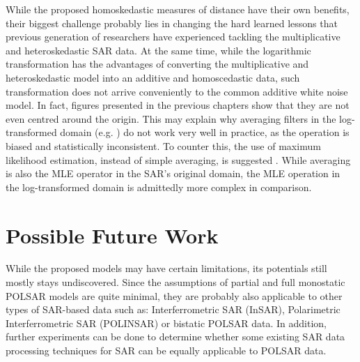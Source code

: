 While
                the proposed homoskedastic measures of distance have
                their own benefits, their biggest challenge probably
                lies in changing the hard learned lessons that
                previous generation of researchers have experienced tackling
                the multiplicative and heteroskedastic SAR data.
At
                the same time, while the logarithmic transformation has
                the advantages of converting the multiplicative and
                heteroskedastic model into an additive and homoscedastic
                data, such transformation does not arrive conveniently
                to the common additive white noise model.
In fact, figures presented in the previous chapters show that 
	they are not even centred around the origin. 
This may explain why averaging filters in the log-transformed domain (e.g. \cite{Arsenault_JOptSocAm_1976}) do not 
	work very well in practice, as the operation is biased and statistically inconsistent.
To counter this, the use of maximum likelihood estimation, instead of simple averaging, 
	is suggested \cite{Le_2011_ACRS}.
While averaging is also the MLE operator in the SAR's original domain,
                the MLE operation in the log-transformed domain is admittedly more complex in comparison.

\section{Possible Future Work}
\label{sec:conclusion_future_work}


While
                the proposed models may have certain limitations, its
                potentials still mostly stays undiscovered.
Since
                the assumptions of partial and full monostatic POLSAR
                models are quite minimal, they are probably also
                applicable to other types of SAR-based data such as: Interferrometric SAR (InSAR), Polarimetric Interferrometric SAR (POLINSAR) 
                or bistatic POLSAR data.
In addition, further experiments can be done to determine whether some existing SAR data processing techniques for SAR can be equally applicable to POLSAR data.

